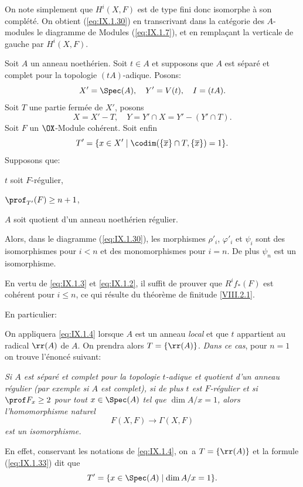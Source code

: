 On note simplement que $H^i(X, F)$ est de type fini donc isomorphe
\`a son compl\'et\'e. On obtient (\ref{eq:IX.1.30}) en transcrivant dans
la cat\'egorie des $A$-modules le diagramme de Modules
(\ref{eq:IX.1.7}), et en rempla\c cant la verticale de gauche par
$H^i(X, F)$.

\begin{proposition}\setcounter {equation}{30} \label{IX.1.4}
Soit $A$ un anneau noeth\'erien. Soit $t\in A$ et supposons que $A$ est s\'epar\'e et complet pour la topologie $(tA)$-adique. Posons:
\begin{equation} \label{eq:IX.1.31}
X'=\Spec (A), \quad Y'=V(t), \quad I=(tA).
\end{equation}
Soit $T$ une partie ferm\'ee de $X'$, posons
\begin{equation} \label{eq:IX.1.32}
X=X'-T, \quad Y=Y'\cap X=Y'-(Y'\cap T).
\end{equation}
Soit $F$ un $\OX$-Module coh\'erent. Soit enfin
\begin{equation} \label{eq:IX.1.33}
T'= \{ x\in X' \mid \codim(\{ \overline{x}\} \cap T, \{\overline{x}\})=1\}.
\end{equation}
Supposons que:
\begin{enumeratea}
\item
$t$ soit $F$-r\'egulier,
\item
$\prof_{T'}(F) \geq n+1$,
\item
$A$ soit quotient d'un anneau noeth\'erien r\'egulier.
\end{enumeratea}
\noindent
Alors, dans le diagramme (\ref{eq:IX.1.30}), les morphismes $\rho'_i$, $\varphi'_i$ et $\psi_i$ sont des isomorphismes pour $i<n$ et des monomorphismes pour $i=n$. De plus $\psi_n$ est un isomorphisme.
\end{proposition}

En vertu de \ref{eq:IX.1.3} et \ref{eq:IX.1.2}, il suffit de prouver que $R^if_*(F)$ est coh\'erent pour $i\leq n$, ce qui r\'esulte du th\'eor\`eme de finitude \ref{VIII.2.1}.

En particulier:

\begin{exemple} \label{IX.1.5} On appliquera \ref{eq:IX.1.4} lorsque $A$ est un anneau \emph{local} et que $t$ appartient au radical $\rr(A)$ de $A$. On prendra alors $T=\{ \rr(A)\}$. \emph{Dans ce cas}, pour $n=1$ on trouve l'\'enonc\'e suivant:

\emph{Si $A$ \ignorespaces est séparé et complet pour la topologie $t$-adique et quotient d'un anneau régulier (par exemple si $A$ est complet), si de plus $t$ est $F$-régulier et si $\prof F_x\geq 2$ pour tout $x\in \Spec (A)$ tel que $\dim A/x=1$, alors l'homomorphisme naturel $$
F(X, F)\to \Gamma(X, F)$$ est un isomorphisme.}

En effet, conservant les notations de \ref{eq:IX.1.4}, on~a $T=\{ \rr(A)\}$ et la formule (\ref{eq:IX.1.33}) dit que
$$
T'=\{x\in\Spec(A)\mid\dim A/x=1\}.
$$
\end{exemple}


